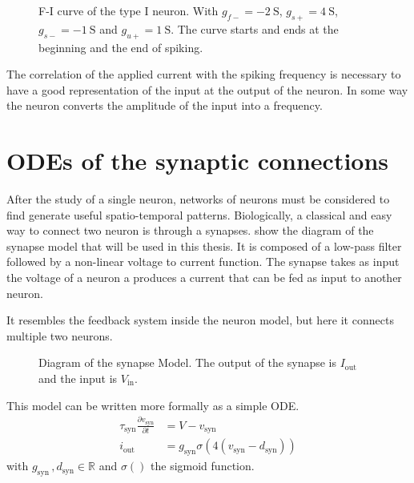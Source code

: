 \begin{figure}[!htb]
    \centering
    \caption{F-I curve of the type I neuron. With $g_{f-}=\qty{-2}{\siemens}$, $g_{s+}=\qty{4}{\siemens}$, $g_{s-}=\qty{-1}{\siemens}$ and $g_{u+}=\qty{1}{\siemens}$. The curve starts and ends at the beginning and the end of spiking.}
    \label{fig:neuron_spiking}
\end{figure}

The correlation of the applied current with the spiking frequency is necessary to have a good representation of the input at the output of the neuron. In some way the neuron converts the amplitude of the input into a frequency. 

\section{ODEs of the synaptic connections}

After the study of a single neuron, networks of neurons must be considered to find generate useful spatio-temporal patterns. 
Biologically, a classical and easy way to connect two neuron is through a synapses.
 show the diagram of the synapse model that will be used in this thesis. 
It is composed of a low-pass filter followed by a non-linear voltage to current function. 
The synapse takes as input the voltage of a neuron a produces a current that can be fed as input to another neuron.

It resembles the feedback system inside the neuron model, but here it connects multiple two neurons.

\begin{figure}[!htb]
    \centering
    \caption{Diagram of the synapse Model. The output of the synapse is $I_\text{out}$ and the input is $V_\text{in}$.}
    \label{fig:synapse_mod}
\end{figure}


This model can be written more formally as a simple ODE.
\begin{align}
    \tau_\text{syn}\frac{\partial v_\text{syn}}{\partial t} &= V - v_\text{syn}\label{eq:syn_start}\\
    i_\text{out} &= g_\text{syn}\sigma\left(4\left(v_\text{syn} - d_\text{syn}\right)\right)\label{eq:syn_end}   
\end{align}
with $g_\text{syn}\,, d_\text{syn} \in \mathbb{R}$ and $\sigma\left(\right)$ the sigmoid function.

